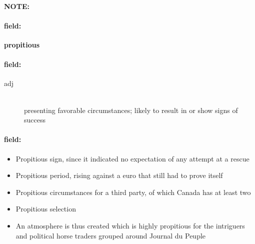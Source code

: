 \documentclass[12pt]{article}
\newenvironment{note}{\paragraph{NOTE:}}{}
\newenvironment{field}{\paragraph{field:}}{}
\begin{document}
\begin{note}
\begin{field}
\textbf{\large propitious}
\end{field}


\begin{field}
\begin{description}
\item[adj] \hfill \\ 
presenting favorable circumstances; likely to result in or show signs of success

\end{description}
\end{field}

\begin{field}
\begin{itemize}
\item Propitious sign, since it indicated no expectation of any attempt at a rescue
\item Propitious period, rising against a euro that still had to prove itself
\item Propitious circumstances for a third party, of which Canada has at least two
\item Propitious selection
\item An atmosphere is thus created which is highly propitious for the intriguers and political horse traders grouped around Journal du Peuple
\end{itemize}
\end{field}
\end{note}
\end{document}
